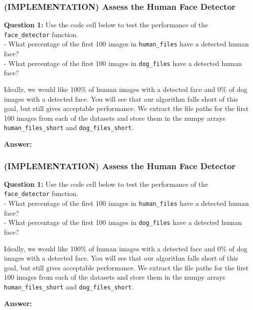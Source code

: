 \documentclass[11pt]{article}
\begin{document}
    \subsubsection{(IMPLEMENTATION) Assess the Human Face
Detector}\label{implementation-assess-the-human-face-detector}

\textbf{Question 1:} Use the code cell below to test the performance of
the \texttt{face\_detector} function.\\
- What percentage of the first 100 images in \texttt{human\_files} have
a detected human face?\\
- What percentage of the first 100 images in \texttt{dog\_files} have a
detected human face?

Ideally, we would like 100\% of human images with a detected face and
0\% of dog images with a detected face. You will see that our algorithm
falls short of this goal, but still gives acceptable performance. We
extract the file paths for the first 100 images from each of the
datasets and store them in the numpy arrays \texttt{human\_files\_short}
and \texttt{dog\_files\_short}.

\textbf{Answer:}

    \subsubsection{(IMPLEMENTATION) Assess the Human Face
Detector}\label{implementation-assess-the-human-face-detector}

\textbf{Question 1:} Use the code cell below to test the performance of
the \texttt{face\_detector} function.\\
- What percentage of the first 100 images in \texttt{human\_files} have
a detected human face?\\
- What percentage of the first 100 images in \texttt{dog\_files} have a
detected human face?

Ideally, we would like 100\% of human images with a detected face and
0\% of dog images with a detected face. You will see that our algorithm
falls short of this goal, but still gives acceptable performance. We
extract the file paths for the first 100 images from each of the
datasets and store them in the numpy arrays \texttt{human\_files\_short}
and \texttt{dog\_files\_short}.

\textbf{Answer:}
\end{document}
